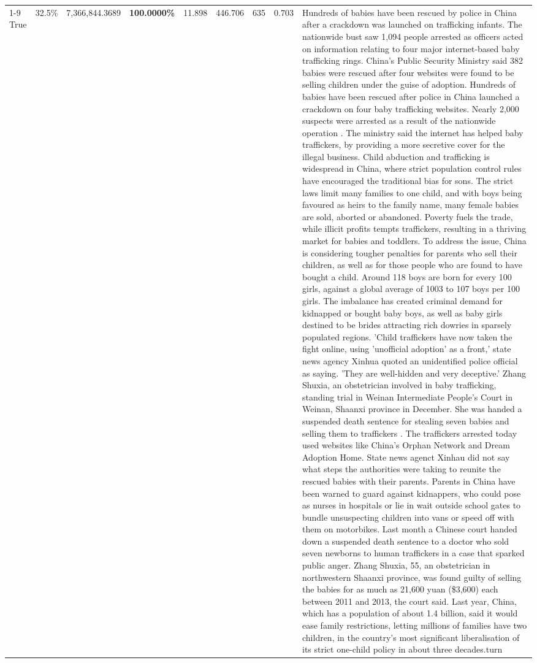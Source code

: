 \begin{table}[H]
\begin{tabular}{lllrlllll}
\cline{1-9}
True & 32.5\% & 7,366,844.3689 & \bfseries \color{red} 100.0000\% & 11.898 & 446.706 & 635 & 0.703 & Hundreds of babies have been rescued by police in China after a crackdown was launched on trafficking infants. The nationwide bust saw 1,094 people arrested as officers acted on information relating to four major internet-based baby trafficking rings. China's Public Security Ministry said 382 babies were rescued after four websites were found to be selling children under the guise of adoption. Hundreds of babies have been rescued after police in China launched a crackdown on four baby trafficking websites. Nearly 2,000 suspects were arrested as a result of the nationwide operation . The ministry said the internet has helped baby traffickers, by providing a more secretive cover for the illegal business. Child abduction and trafficking is widespread in China, where strict population control rules have encouraged the traditional bias for sons. The strict laws limit many families to one child, and with boys being favoured as heirs to the family name, many female babies are sold, aborted or abandoned. Poverty fuels the trade, while illicit profits tempts traffickers, resulting in a thriving market for babies and toddlers. To address the issue, China is considering tougher penalties for parents who sell their children, as well as for those people who are found to have bought a child. Around 118 boys are born for every 100 girls, against a global average of 1003 to 107 boys per 100 girls. The imbalance has created criminal demand for kidnapped or bought baby boys, as well as baby girls destined to be brides attracting rich dowries in sparsely populated regions. 'Child traffickers have now taken the fight online, using 'unofficial adoption' as a front,' state news agency Xinhua quoted an unidentified police official as saying. 'They are well-hidden and very deceptive.' Zhang Shuxia, an obstetrician involved in baby trafficking, standing trial in Weinan Intermediate People's Court in Weinan, Shaanxi province in December. She was handed a suspended death sentence for stealing seven babies and selling them to traffickers . The traffickers arrested today used websites like China's Orphan Network and Dream Adoption Home. State news agenct Xinhau did not say what steps the authorities were taking to reunite the rescued babies with their parents. Parents in China have been warned to guard against kidnappers, who could pose as nurses in hospitals or lie in wait outside school gates to bundle unsuspecting children into vans or speed off with them on motorbikes. Last month a Chinese court handed down a suspended death sentence to a doctor who sold seven newborns to human traffickers in a case that sparked public anger. Zhang Shuxia, 55, an obstetrician in northwestern Shaanxi province, was found guilty of selling the babies for as much as 21,600 yuan (\$3,600) each between 2011 and 2013, the court said. Last year, China, which has a population of about 1.4 billion, said it would ease family restrictions, letting millions of families have two children, in the country's most significant liberalisation of its strict one-child policy in about three decades.turn \\

\end{tabular}
\end{table}
